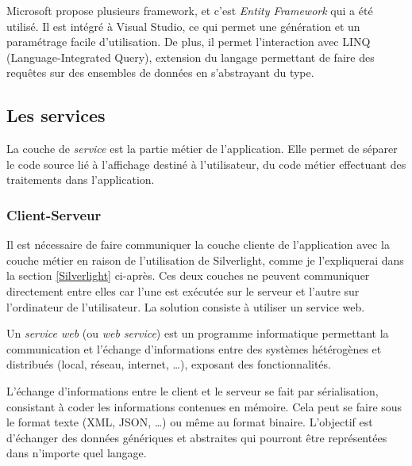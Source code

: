 Microsoft propose plusieurs framework, et c'est \textit{Entity Framework} qui a été utilisé. Il est intégré à Visual Studio, ce qui permet une génération et un paramétrage facile d'utilisation. De plus, il permet l'interaction avec  LINQ (Language-Integrated Query), extension du langage permettant de faire des requêtes sur des ensembles de données en s'abstrayant du type.


\subsection{Les services}

La couche de \textit{service} est la partie métier de l'application. Elle permet de séparer le code source lié à l'affichage destiné à l'utilisateur, du code métier effectuant des traitements dans l'application.


\subsubsection{Client-Serveur}


Il est nécessaire de faire communiquer la couche cliente de l'application avec la couche métier en raison de l'utilisation de Silverlight, comme je l'expliquerai dans la section \ref{Silverlight} ci-après. Ces deux couches ne peuvent communiquer directement entre elles car l'une est exécutée sur le serveur et l'autre sur l'ordinateur de l'utilisateur. La solution consiste à utiliser un service web.



Un \textit{service web} (ou \textit{web service}) est un programme informatique permettant la communication et l'échange d'informations entre des systèmes hétérogènes et distribués (local, réseau, internet, \ldots), exposant des fonctionnalités.

L'échange d'informations entre le client et le serveur se fait par sérialisation, consistant à coder les informations contenues en mémoire. Cela peut se faire sous le format texte (XML, JSON, \ldots) ou même au format binaire. L'objectif est d'échanger des données génériques et abstraites qui pourront être représentées dans n'importe quel langage.

